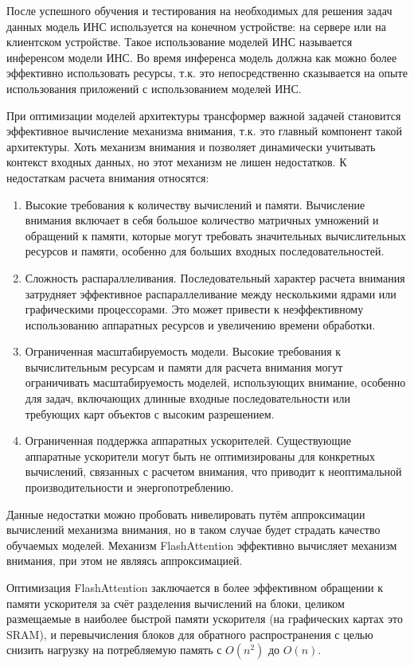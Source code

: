 После успешного обучения и тестирования на необходимых для решения задач данных модель ИНС используется на конечном устройстве: на сервере или на клиентском устройстве. Такое использование моделей ИНС называется инференсом модели ИНС. Во время инференса модель должна как можно более эффективно использовать ресурсы, т.к. это непосредственно сказывается на опыте использования приложений с использованием моделей ИНС.

При оптимизации моделей архитектуры трансформер важной задачей становится эффективное вычисление механизма внимания, т.к. это главный компонент такой архитектуры. Хоть механизм внимания и позволяет динамически учитывать контекст входных данных, но этот механизм не лишен недостатков. К недостаткам расчета внимания относятся:
\begin{enumerate}
    \item Высокие требования к количеству вычислений и памяти. Вычисление внимания включает в себя большое количество матричных умножений и обращений к памяти, которые могут требовать значительных вычислительных ресурсов и памяти, особенно для больших входных последовательностей.
    \item Сложность распараллеливания. Последовательный характер расчета внимания затрудняет эффективное распараллеливание между несколькими ядрами или графическими процессорами. Это может привести к неэффективному использованию аппаратных ресурсов и увеличению времени обработки.
    \item Ограниченная масштабируемость модели. Высокие требования к вычислительным ресурсам и памяти для расчета внимания могут ограничивать масштабируемость моделей, использующих внимание, особенно для задач, включающих длинные входные последовательности или требующих карт объектов с высоким разрешением.
    \item Ограниченная поддержка аппаратных ускорителей. Существующие аппаратные ускорители могут быть не оптимизированы для конкретных вычислений, связанных с расчетом внимания, что приводит к неоптимальной производительности и энергопотреблению.
\end{enumerate}

Данные недостатки можно пробовать нивелировать путём аппроксимации вычислений механизма внимания, но в таком случае будет страдать качество обучаемых моделей. Механизм FlashAttention \cite{flash-attn-paper} эффективно вычисляет механизм внимания, при этом не являясь аппроксимацией.

Оптимизация FlashAttention заключается в более эффективном обращении к памяти ускорителя за счёт разделения вычислений на блоки, целиком размещаемые в наиболее быстрой памяти ускорителя (на графических картах это SRAM), и перевычисления блоков для обратного распространения с целью снизить нагрузку на потребляемую память с $O(n^2)$ до $O(n)$.

